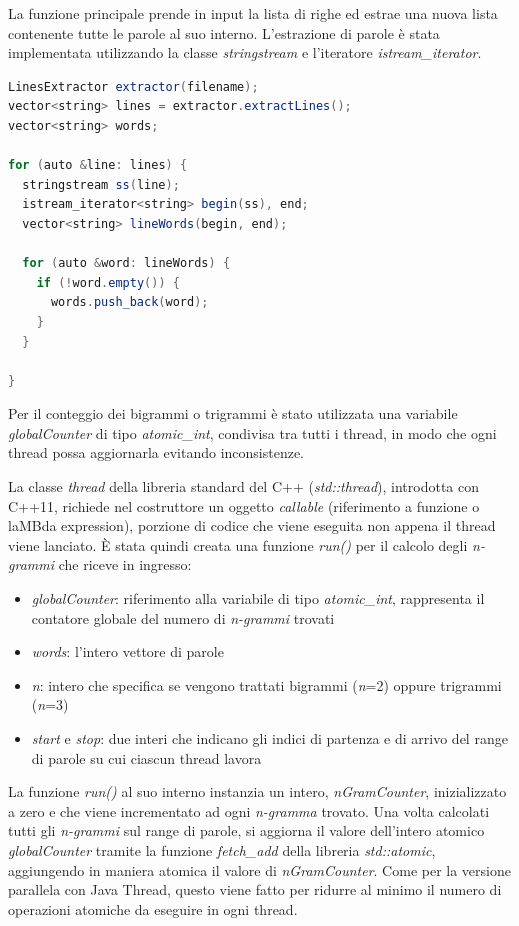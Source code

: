 \documentclass[10pt,twocolumn,letterpaper]{article}
\begin{document}
La funzione principale prende in input la lista di righe ed estrae una nuova lista contenente tutte le parole al suo interno. L'estrazione di parole è stata implementata utilizzando la classe \textit{stringstream} e l'iteratore \textit{istream\_iterator}.\newline

\begin{lstlisting}[basicstyle=\scriptsize, language=Java, frame=single, caption={Esempio di estrazione di parole in C++},captionpos=b, showstringspaces=false]
LinesExtractor extractor(filename);
vector<string> lines = extractor.extractLines();
vector<string> words;

for (auto &line: lines) {
  stringstream ss(line);
  istream_iterator<string> begin(ss), end;
  vector<string> lineWords(begin, end);
  
  for (auto &word: lineWords) {
    if (!word.empty()) { 
      words.push_back(word);
    }
  }
  
}
\end{lstlisting}

Per il conteggio dei bigrammi o trigrammi è stato utilizzata una variabile \textit{globalCounter} di tipo \textit{atomic\_int}, condivisa tra tutti i thread, in modo che ogni thread possa aggiornarla evitando inconsistenze.

La classe \textit{thread} della libreria standard del C++ (\textit{std::thread}), introdotta con C++11, richiede nel costruttore un oggetto \textit{callable} (riferimento a funzione o laMBda expression), porzione di codice che viene eseguita non appena il thread viene lanciato.
È stata quindi creata una funzione \textit{run()} per il calcolo degli \textit{n-grammi} che riceve in ingresso:
\begin{itemize}
	\item \textit{globalCounter}: riferimento alla variabile di tipo \textit{atomic\_int}, rappresenta il contatore globale del numero di \textit{n-grammi} trovati
	\item \textit{words}: l'intero vettore di parole
	\item \textit{n}: intero che specifica se vengono trattati bigrammi (\textit{n}=2) oppure trigrammi (\textit{n}=3)
	\item \textit{start} e \textit{stop}: due interi che indicano gli indici di partenza e di arrivo del range di parole su cui ciascun thread lavora
\end{itemize}

La funzione \textit{run()} al suo interno instanzia un intero, \textit{nGramCounter}, inizializzato a zero e che viene incrementato ad ogni \textit{n-gramma} trovato. Una volta calcolati tutti gli \textit{n-grammi} sul range di parole, si aggiorna il valore dell'intero atomico \textit{globalCounter} tramite la funzione \textit{fetch\_add} della libreria \textit{std::atomic}, aggiungendo in maniera atomica il valore di \textit{nGramCounter}. Come per la versione parallela con Java Thread, questo viene fatto per ridurre al minimo il numero di operazioni atomiche da eseguire in ogni thread.\newline
\end{document}
